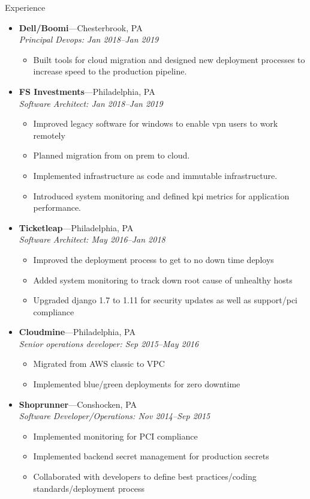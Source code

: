 \documentclass[11pt,oneside]{article}
\newenvironment{ressection}[1]{
        \vspace{4pt}
        {\fontfamily{phv}\selectfont\Large#1}
        \begin{itemize}
        \vspace{3pt}
}{
        \end{itemize}
}
\newcommand{\ressubitem}[1]{
        \vspace{-1pt}
        \item \begin{flushleft} #1 \end{flushleft}
}
\newcommand{\resbigitem}[3]{
        \vspace{-5pt}
        \item
        \textbf{#1}---#2 \\
        \textit{#3}
}
\newenvironment{ressubsec}[3]{
        \resbigitem{#1}{#2}{#3}
        \vspace{-2pt}
        \begin{itemize}
}{
        \end{itemize}
}
\begin{document}
\begin{ressection}{Experience}
        \begin{ressubsec}{Dell/Boomi}{Chesterbrook, PA}{Principal Devops: Jan 2018--Jan 2019}
          \ressubitem{Built tools for cloud migration and designed new deployment processes to increase speed to the production pipeline. }
        \end{ressubsec}
  
        \begin{ressubsec}{FS Investments}{Philadelphia, PA}{Software Architect: Jan 2018--Jan 2019}
          \ressubitem{Improved legacy software for windows to enable vpn users to work remotely }
          \ressubitem{Planned migration from on prem to cloud.}
          \ressubitem{Implemented infrastructure as code and immutable infrastructure. }
          \ressubitem{Introduced system monitoring and defined kpi metrics for application performance. }          
        \end{ressubsec}
  
        \begin{ressubsec}{Ticketleap}{Philadelphia, PA}{Software Architect: May 2016--Jan 2018}
          \ressubitem{Improved the deployment process to get to no down time deploys }
          \ressubitem{Added system monitoring to track down root cause of unhealthy hosts}
          \ressubitem{Upgraded django 1.7 to 1.11 for security updates as well as support/pci compliance }
        \end{ressubsec}
  
        \begin{ressubsec}{Cloudmine}{Philadelphia, PA}{Senior operations developer: Sep 2015--May 2016}

          \ressubitem{Migrated from AWS classic to VPC }
          \ressubitem{Implemented blue/green deployments for zero downtime }
        \end{ressubsec}
        
        \begin{ressubsec}{Shoprunner}{Conshocken, PA}{Software Developer/Operations: Nov 2014--Sep 2015}

          \ressubitem{Implemented monitoring for PCI compliance }
          \ressubitem{Implemented backend secret management for production secrets }
          \ressubitem{Collaborated with developers to define best practices/coding standards/deployment process}

        \end{ressubsec}
        


\end{ressection}
\end{document}

